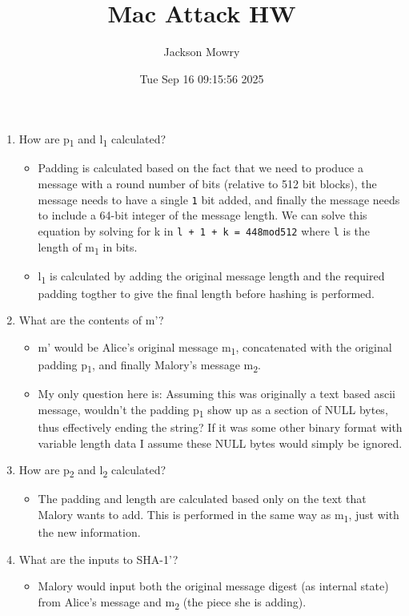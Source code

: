 \documentclass[11pt]{article}
\author{Jackson Mowry}
\date{Tue Sep 16 09:15:56 2025}
\title{Mac Attack HW}
\begin{document}
\maketitle
\tableofcontents

\begin{enumerate}
\item How are p\textsubscript{1} and l\textsubscript{1} calculated?
\begin{itemize}
\item Padding is calculated based on the fact that we need to produce a message with a round number of bits (relative to 512 bit blocks), the message needs to have a single \texttt{1} bit added, and finally the message needs to include a 64-bit integer of the message length. We can solve this equation by solving for k in \texttt{l + 1 + k = 448mod512} where \texttt{l} is the length of m\textsubscript{1} in bits.
\item l\textsubscript{1} is calculated by adding the original message length and the required padding togther to give the final length before hashing is performed.
\end{itemize}
\item What are the contents of m'?
\begin{itemize}
\item m' would be Alice's original message m\textsubscript{1}, concatenated with the original padding p\textsubscript{1}, and finally Malory's message m\textsubscript{2}.
\item My only question here is: Assuming this was originally a text based ascii message, wouldn't the padding p\textsubscript{1} show up as a section of NULL bytes, thus effectively ending the string? If it was some other binary format with variable length data I assume these NULL bytes would simply be ignored.
\end{itemize}
\item How are p\textsubscript{2} and l\textsubscript{2} calculated?
\begin{itemize}
\item The padding and length are calculated based only on the text that Malory wants to add. This is performed in the same way as m\textsubscript{1}, just with the new information.
\end{itemize}
\item What are the inputs to SHA-1'?
\begin{itemize}
\item Malory would input both the original message digest (as internal state) from Alice's message and m\textsubscript{2} (the piece she is adding).

\end{itemize}
\end{enumerate}
\end{document}
